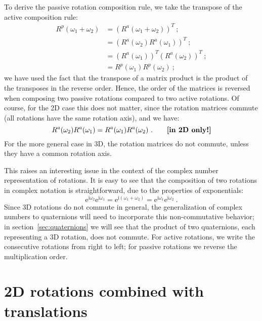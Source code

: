 To derive the passive rotation composition rule, we take the transpose of the active composition rule:
\begin{align*}
	R^p(\omega_1+\omega_2) &= \left(R^a(\omega_1+\omega_2)\right)^T\ ;\\ 
	&= \left(R^a(\omega_2)R^a(\omega_1)\right)^T\ ;\\
	&= \left(R^a(\omega_1)\right)^T\left(R^a(\omega_2)\right)^T\ ;\\
	&= R^p(\omega_1)R^p(\omega_2)\ ;
\end{align*}
we have used the fact that the transpose of a matrix product is the product of the transposes in the reverse order.  Hence, the order of the matrices is reversed when composing two passive rotations compared to two active rotations.  Of course, for the 2D case this does not matter, since the rotation matrices commute (all rotations have the same rotation axis), and we have:
\[
	R^a(\omega_2)R^a(\omega_1) = R^a(\omega_1)R^a(\omega_2)\ .\qquad\text{\textbf{[in 2D only!]}}
\]
For the more general case in 3D, the rotation matrices do not commute, unless they have a common rotation axis. 

This raises an interesting issue in the context of the complex number representation of rotations.  It is easy to see that the composition of two rotations in complex notation is straightforward, due to the properties of exponentials:
\[
	\mathrm{e}^{\mathrm{i}\omega_2}\mathrm{e}^{\mathrm{i}\omega_1}
	=\mathrm{e}^{\mathrm{i}(\omega_1+\omega_2)} = 
	\mathrm{e}^{\mathrm{i}\omega_1}\mathrm{e}^{\mathrm{i}\omega_2}\ .
\]	
Since 3D rotations do not commute in general, the generalization of complex numbers to quaternions will need to incorporate this non-commutative behavior; in section~\ref{sec:quaternions} we will see that the product of two quaternions, each representing a 3D rotation, does not commute.  For active rotations, we write the consecutive rotations from right to left; for passive rotations we reverse the multiplication order.

\section{2D rotations combined with translations}





